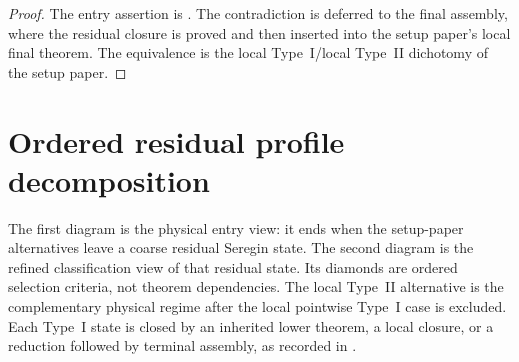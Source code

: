 \documentclass[11pt]{amsart}
\numberwithin{equation}{section}
\theoremstyle{plain}
\theoremstyle{definition}
\theoremstyle{remark}
\begin{document}
\begin{proof}
The entry assertion is .  The
contradiction is deferred to the final assembly, where the residual closure is
proved and then inserted into the setup paper's local final theorem.  The
equivalence is the local Type~I/local Type~II dichotomy of the setup paper.
\end{proof}

\section{Ordered residual profile decomposition}
\label{sec:mermaid-decision-tree}

The first diagram is the physical entry view: it ends when the setup-paper
alternatives leave a coarse residual Seregin state.  The second diagram is the
refined classification view of that residual state.  Its diamonds are ordered
selection criteria, not theorem dependencies.  The local Type~II alternative
is the complementary physical regime after the local pointwise Type~I case is
excluded.  Each Type~I state is closed by an inherited lower theorem, a local
closure, or a reduction followed by terminal assembly, as recorded in
.
\end{document}
